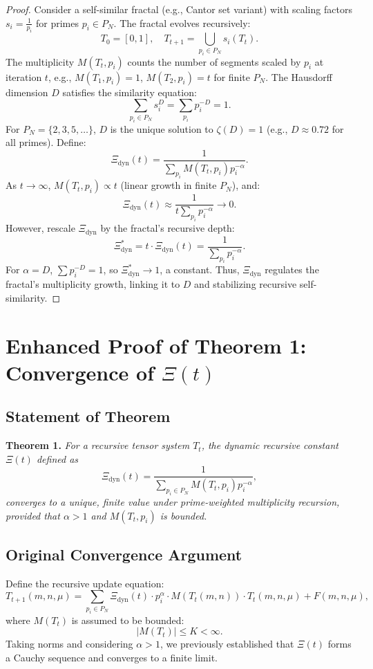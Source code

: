 \documentclass[12pt]{article}
\begin{document}
\begin{proof}
Consider a self-similar fractal (e.g., Cantor set variant) with scaling factors \( s_i = \frac{1}{p_i} \) for primes \( p_i \in P_N \). The fractal evolves recursively:
\[
T_0 = [0, 1], \quad T_{t+1} = \bigcup_{p_i \in P_N} s_i(T_t).
\]
The multiplicity \( M(T_t, p_i) \) counts the number of segments scaled by \( p_i \) at iteration \( t \), e.g., \( M(T_1, p_i) = 1 \), \( M(T_2, p_i) = t \) for finite \( P_N \). The Hausdorff dimension \( D \) satisfies the similarity equation:
\[
\sum_{p_i \in P_N} s_i^D = \sum_{p_i} p_i^{-D} = 1.
\]
For \( P_N = \{2, 3, 5, \ldots\} \), \( D \) is the unique solution to \(\zeta(D) = 1\) (e.g., \( D \approx 0.72 \) for all primes). Define:
\[
\Xi_{\text{dyn}}(t) = \frac{1}{\sum_{p_i} M(T_t, p_i) p_i^{-\alpha}}.
\]
As \( t \to \infty \), \( M(T_t, p_i) \propto t \) (linear growth in finite \( P_N \)), and:
\[
\Xi_{\text{dyn}}(t) \approx \frac{1}{t \sum_{p_i} p_i^{-\alpha}} \to 0.
\]
However, rescale $\Xi_{\text{dyn}}$ by the fractal’s recursive depth:
\[
\Xi_{\text{dyn}}^* = t \cdot \Xi_{\text{dyn}}(t) = \frac{1}{\sum_{p_i} p_i^{-\alpha}}.
\]
For \(\alpha = D\), \(\sum p_i^{-D} = 1\), so $\Xi_{\text{dyn}}^* \to 1$, a constant. Thus, $\Xi_{\text{dyn}}$ regulates the fractal’s multiplicity growth, linking it to \( D \) and stabilizing recursive self-similarity.
\end{proof}
\section{Enhanced Proof of Theorem 1: Convergence of \(\Xi(t) \)}

\subsection{Statement of Theorem}
\textbf{Theorem 1.} \textit{For a recursive tensor system \( T_t \), the dynamic recursive constant \(\Xi(t) \) defined as}
\begin{equation}
    \Xi_{\text{dyn}}(t) = \frac{1}{\sum_{p_i \in P_N} M(T_t, p_i) p_i^{-\alpha}},
\end{equation}
\textit{converges to a unique, finite value under prime-weighted multiplicity recursion, provided that \( \alpha > 1 \) and \( M(T_t, p_i) \) is bounded.}

\subsection{Original Convergence Argument}
Define the recursive update equation:
\begin{equation}
    T_{t+1}(m,n,\mu) = \sum_{p_i \in P_N} \Xi_{\text{dyn}}(t) \cdot p_i^\alpha \cdot M(T_t(m,n)) \cdot T_t(m,n,\mu) + F(m,n,\mu),
\end{equation}
where \( M(T_t) \) is assumed to be bounded:
\begin{equation}
    |M(T_t)| \leq K < \infty.
\end{equation}
Taking norms and considering \( \alpha > 1 \), we previously established that \(\Xi(t) \) forms a Cauchy sequence and converges to a finite limit.
\end{document}
